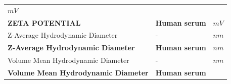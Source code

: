 \documentclass[utf8]{frontiersHLTH} %
\begin{document}
\begin{longtable}[]{@{}lll@{}}
\begin{minipage}[t]{0.13\columnwidth}
\(mV\)\strut
\end{minipage}\tabularnewline
\begin{minipage}[t]{0.58\columnwidth}\raggedright\strut
\textbf{ZETA POTENTIAL}\strut
\end{minipage} & \begin{minipage}[t]{0.20\columnwidth}\raggedright\strut
\textbf{Human serum}\strut
\end{minipage} & \begin{minipage}[t]{0.13\columnwidth}\raggedright\strut
\(mV\)\strut
\end{minipage}\tabularnewline
\begin{minipage}[t]{0.58\columnwidth}\raggedright\strut
Z-Average Hydrodynamic Diameter\strut
\end{minipage} & \begin{minipage}[t]{0.20\columnwidth}\raggedright\strut
-\strut
\end{minipage} & \begin{minipage}[t]{0.13\columnwidth}\raggedright\strut
\(nm\)\strut
\end{minipage}\tabularnewline
\begin{minipage}[t]{0.58\columnwidth}\raggedright\strut
\textbf{Z-Average Hydrodynamic Diameter}\strut
\end{minipage} & \begin{minipage}[t]{0.20\columnwidth}\raggedright\strut
\textbf{Human serum}\strut
\end{minipage} & \begin{minipage}[t]{0.13\columnwidth}\raggedright\strut
\(nm\)\strut
\end{minipage}\tabularnewline
\begin{minipage}[t]{0.58\columnwidth}\raggedright\strut
Volume Mean Hydrodynamic Diameter\strut
\end{minipage} & \begin{minipage}[t]{0.20\columnwidth}\raggedright\strut
-\strut
\end{minipage} & \begin{minipage}[t]{0.13\columnwidth}\raggedright\strut
\(nm\)\strut
\end{minipage}\tabularnewline
\begin{minipage}[t]{0.58\columnwidth}\raggedright\strut
\textbf{Volume Mean Hydrodynamic Diameter}\strut
\end{minipage} & \begin{minipage}[t]{0.20\columnwidth}\raggedright\strut
\textbf{Human serum}\strut
\end{minipage} & \begin{minipage}[t]{0.13\columnwidth}\raggedright\strut

\end{minipage}
\end{longtable}
\end{document}
